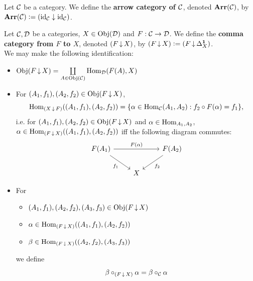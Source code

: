 \documentclass{book}
\begin{document}
	\begin{defn} 
		Let $\mathcal{C}$ be a category. We define the \textbf{arrow category of $\mathcal{C}$}, denoted $\operatorname{\textbf{Arr}}(\mathcal{C})$, by $\operatorname{\textbf{Arr}}(\mathcal{C}) \vcentcolon= (\operatorname{id}_{\mathcal{C}} \downarrow \operatorname{id}_{\mathcal{C}})$.
	\end{defn}

	\begin{note}
	\end{note}
	
	\begin{defn} 
		Let $\mathcal{C}, \mathcal{D}$ be a categories, $X \in \operatorname{Obj}(\mathcal{D})$ and $F: \mathcal{C} \rightarrow \mathcal{D}$. We define the \textbf{comma category from $F$ to $X$}, denoted $(F \operatorname{\downarrow} X)$, by $(F \operatorname{\downarrow} X) \vcentcolon= (F \operatorname{\downarrow} \Delta^{\mathbf{1}}_X)$.\\
		We may make the following identification:
		\begin{itemize}
			\item $\operatorname{Obj}(F \operatorname{\downarrow} X) = \coprod\limits_{A \in \operatorname{Obj}(\mathcal{C})} \operatorname{Hom}_{\mathcal{D}}(F(A), X)$ 
			\item For $(A_1, f_1), (A_2, f_2) \in \operatorname{Obj}(F \operatorname{\downarrow} X)$, 
			$$\operatorname{Hom}_{(X \operatorname{\downarrow} F)}((A_1, f_1), (A_2, f_2)) = \{\alpha \in \operatorname{Hom}_{\mathcal{C}}(A_1, A_2): f_2 \circ F(\alpha) = f_1\},$$
			i.e. for $(A_1, f_1), (A_2, f_2) \in \operatorname{Obj}(F \operatorname{\downarrow} X)$ and $\alpha \in \operatorname{Hom}_{A_1, A_2}$, $\alpha \in \operatorname{Hom}_{(F \operatorname{\downarrow} X)}((A_1, f_1), (A_2, f_2))$ iff the following diagram commutes:
			\[ 
			\begin{tikzcd}
				F(A_1) \arrow[dr, "f_1"'] \arrow[rr, "F(\al)"] &&  F(A_2) \arrow[dl, "f_2"]\\
				& X  & 
			\end{tikzcd}
			\]
			\item For 
			\begin{itemize}
				\item $(A_1, f_1), (A_2, f_2), (A_3, f_3) \in \operatorname{Obj}(F \operatorname{\downarrow} X)$
				\item $\alpha \in \operatorname{Hom}_{(F \operatorname{\downarrow} X)}((A_1, f_1), (A_2, f_2))$
				\item $\beta \in \operatorname{Hom}_{(F \operatorname{\downarrow} X)}((A_2, f_2), (A_3, f_3))$
			\end{itemize}
			we define 
			$$\beta \circ_{(F \operatorname{\downarrow} X)} \alpha = \beta \circ_{\mathcal{C}} \alpha $$
		\end{itemize}
	\end{defn}
\end{document}
